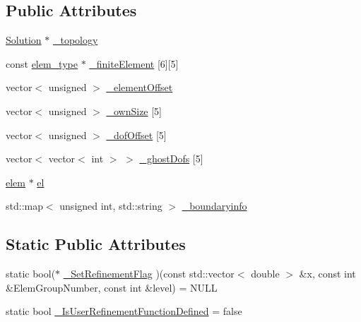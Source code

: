 \subsection*{Public Attributes}
\begin{DoxyCompactItemize}
\item 
\mbox{\hyperlink{classfemus_1_1_solution}{Solution}} $\ast$ \mbox{\hyperlink{classfemus_1_1_mesh_ac436cfb1f4caaec0c4335358ff8a51d8}{\+\_\+topology}}
\item 
const \mbox{\hyperlink{classfemus_1_1elem__type}{elem\+\_\+type}} $\ast$ \mbox{\hyperlink{classfemus_1_1_mesh_a64903ffb092f89f9db3e2e2a9e6753d6}{\+\_\+finite\+Element}} \mbox{[}6\mbox{]}\mbox{[}5\mbox{]}
\item 
vector$<$ unsigned $>$ \mbox{\hyperlink{classfemus_1_1_mesh_a58a4e32a12bc1035bba5344f94053fcb}{\+\_\+element\+Offset}}
\item 
vector$<$ unsigned $>$ \mbox{\hyperlink{classfemus_1_1_mesh_ac84ffc23a964d3666ed739a941cdcdb5}{\+\_\+own\+Size}} \mbox{[}5\mbox{]}
\item 
vector$<$ unsigned $>$ \mbox{\hyperlink{classfemus_1_1_mesh_a39f815950bee8ece8410deb03e35811a}{\+\_\+dof\+Offset}} \mbox{[}5\mbox{]}
\item 
vector$<$ vector$<$ int $>$ $>$ \mbox{\hyperlink{classfemus_1_1_mesh_ab1e13316ec7488033c0482ce1c33d22d}{\+\_\+ghost\+Dofs}} \mbox{[}5\mbox{]}
\item 
\mbox{\hyperlink{classfemus_1_1elem}{elem}} $\ast$ \mbox{\hyperlink{classfemus_1_1_mesh_a62689335aebc9de69b7490bfb32f0978}{el}}
\item 
std\+::map$<$ unsigned int, std\+::string $>$ \mbox{\hyperlink{classfemus_1_1_mesh_ab25dfff5eab8482dce04738823ebd8b0}{\+\_\+boundaryinfo}}
\end{DoxyCompactItemize}
\subsection*{Static Public Attributes}
\begin{DoxyCompactItemize}
\item 
static bool($\ast$ \mbox{\hyperlink{classfemus_1_1_mesh_af04b1f8834b10a9024543aaedcbf2c34}{\+\_\+\+Set\+Refinement\+Flag}} )(const std\+::vector$<$ double $>$ \&x, const int \&Elem\+Group\+Number, const int \&level) = N\+U\+LL
\item 
static bool \mbox{\hyperlink{classfemus_1_1_mesh_a986dcb4fb17061e161b4050374b28607}{\+\_\+\+Is\+User\+Refinement\+Function\+Defined}} = false
\end{DoxyCompactItemize}
